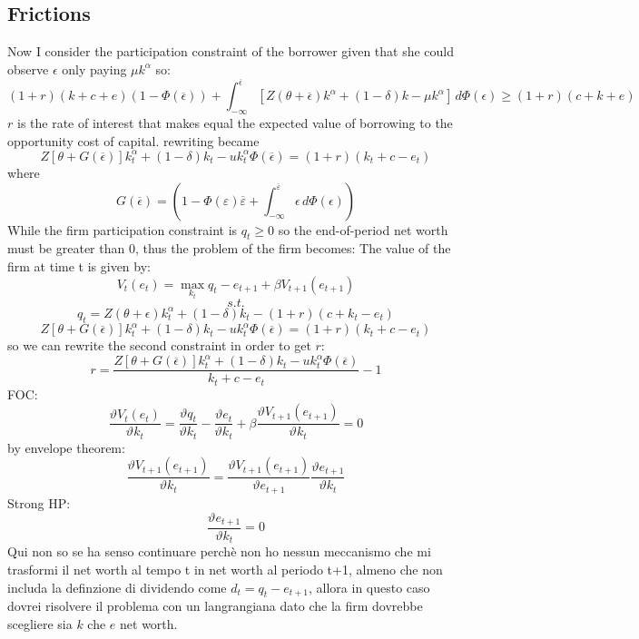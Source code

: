\documentclass{article}
\begin{document}
\subsection{Frictions}
Now I consider the participation constraint of the borrower given that she could observe \(\epsilon\) only paying \(\mu
k^\alpha\) so:
\[
 (1+r )(k+c+e)(1-\Phi(\overline{\epsilon}))+\int_{-\infty}^{\overline{\epsilon}}[Z(\theta+\overline{\epsilon})
k^\alpha+(1-\delta)k-\mu k^\alpha] \,d\Phi(\epsilon) \geq (1+r)(c+k+e)
 \]
\(r\) is the rate of interest that makes equal the expected value of borrowing to the opportunity cost of capital.
rewriting became 
\[
Z[\theta+G(\overline{\epsilon} )]k_t^\alpha+(1-\delta)k_t-uk_t^\alpha\Phi (\overline{\epsilon})=(1+r)(k_t+c-e_t)
\]
where
\[G(\overline{\epsilon} )= (1-\Phi(\varepsilon )\overline{\varepsilon }
+\int_{-\infty}^{\overline{\varepsilon}}\epsilon\,d \Phi(\epsilon) )\]
While the firm participation constraint is \(q_t \geq 0 \) so the end-of-period net worth must be greater than 0, thus
the problem of the firm becomes:
The value of the firm at time t is given by:
\[V_t(e_t) =\max_{k_t}  q_t - e_{t+1} + \beta V_{t+1}(e_{t+1})\]
\[s.t.\]
\[q_{t} = Z(\theta +\epsilon)k_t^\alpha + (1-\delta )k_t - (1+r)(c+k_t-e_t)\]
\[
Z[\theta+G(\overline{\epsilon} )]k_t^\alpha+(1-\delta)k_t-uk_t^\alpha\Phi (\overline{\epsilon})=(1+r)(k_t+c-e_t)
\]
so we can rewrite the second constraint in order to get \(r\):
\[r = \frac{Z[\theta+G(\overline{\epsilon} )]k_t^\alpha+(1-\delta)k_t-uk_t^\alpha\Phi (\overline{\epsilon})}{k_t+c-e_t}-1\]
FOC:
\[\frac{\vartheta
V_{t}(e_{t})}{\vartheta k_t } = \frac{\vartheta
q_{t}}{\vartheta k_t } - \frac{\vartheta
e_{t}}{\vartheta k_t } + \beta \frac{\vartheta
V_{t+1}(e_{t+1})}{\vartheta k_{t} } = 0\]
by envelope theorem:
\[\frac{\vartheta
V_{t+1}(e_{t+1})}{\vartheta k_{t} } = \frac{\vartheta
V_{t+1}(e_{t+1})}{\vartheta e_{t+1} }\frac{\vartheta e_{t+1}}{\vartheta k_t}\]
Strong HP: \[\frac{\vartheta e_{t+1}}{\vartheta k_t} = 0\]
Qui non so se ha senso continuare perchè non ho nessun meccanismo che mi trasformi il net worth al tempo t in net worth
al periodo t+1, almeno che non includa la definzione di dividendo come \(d_t= q_t-e_{t+1}\), allora in questo caso
dovrei risolvere il problema con un langrangiana dato che la firm dovrebbe scegliere sia \(k\) che \(e\) net worth.
\end{document}
